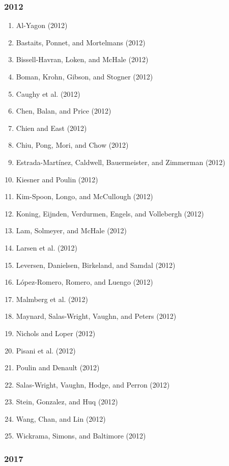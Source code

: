 \documentclass[english,man]{apa6}
\providecommand{\tightlist}{%
  \setlength{\itemsep}{0pt}\setlength{\parskip}{0pt}}
\begin{document}
\subsubsection{2012}\label{section-14}

\begin{enumerate}
\def\labelenumi{\arabic{enumi})}
\tightlist
\item
  Al-Yagon (2012)
\item
  Bastaits, Ponnet, and Mortelmans (2012)
\item
  Bissell-Havran, Loken, and McHale (2012)
\item
  Boman, Krohn, Gibson, and Stogner (2012)
\item
  Caughy et al. (2012)
\item
  Chen, Balan, and Price (2012)
\item
  Chien and East (2012)
\item
  Chiu, Pong, Mori, and Chow (2012)
\item
  Estrada-Martínez, Caldwell, Bauermeister, and Zimmerman (2012)
\item
  Kiesner and Poulin (2012)
\item
  Kim-Spoon, Longo, and McCullough (2012)
\item
  Koning, Eijnden, Verdurmen, Engels, and Vollebergh (2012)
\item
  Lam, Solmeyer, and McHale (2012)
\item
  Larsen et al. (2012)
\item
  Leversen, Danielsen, Birkeland, and Samdal (2012)
\item
  López-Romero, Romero, and Luengo (2012)
\item
  Malmberg et al. (2012)
\item
  Maynard, Salas-Wright, Vaughn, and Peters (2012)
\item
  Nichols and Loper (2012)
\item
  Pisani et al. (2012)
\item
  Poulin and Denault (2012)
\item
  Salas-Wright, Vaughn, Hodge, and Perron (2012)
\item
  Stein, Gonzalez, and Huq (2012)
\item
  Wang, Chan, and Lin (2012)
\item
  Wickrama, Simons, and Baltimore (2012)
\end{enumerate}

\subsubsection{2017}\label{section-15}
\end{document}
